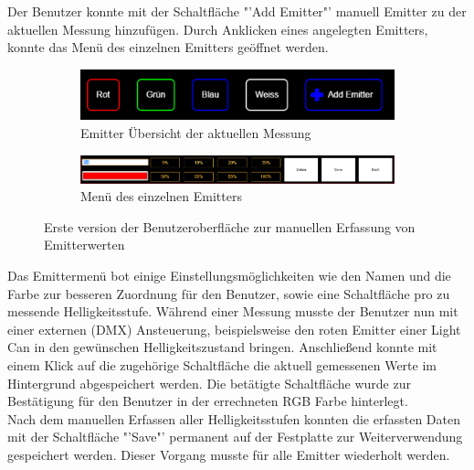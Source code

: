 \documentclass[11pt]{scrartcl}
\begin{document}
Der Benutzer konnte mit der Schaltfläche "'Add Emitter"' manuell Emitter zu der aktuellen Messung hinzufügen. Durch Anklicken eines angelegten
Emitters, konnte das Menü des einzelnen Emitters geöffnet werden.
\begin{figure}[H]
    \centering
    \begin{subfigure}[b]{\textwidth}
        \includegraphics[width=\textwidth]{images/app_emitters_v1.png}
        \caption{Emitter Übersicht der aktuellen Messung}
    \end{subfigure}
    \hfill 
    \begin{subfigure}[b]{\textwidth}
        \includegraphics[width=\textwidth]{images/app_edit_emitters_v1.png}
        \caption{Menü des einzelnen Emitters}
    \end{subfigure}
    \caption{Erste version der Benutzeroberfläche zur manuellen Erfassung von Emitterwerten}
\end{figure}
\noindent
Das Emittermenü bot einige Einstellungsmöglichkeiten wie den Namen und die Farbe zur besseren Zuordnung für den Benutzer, sowie eine Schaltfläche pro zu messende
Helligkeitsstufe. Während einer Messung musste der Benutzer nun mit einer externen (DMX) Ansteuerung, beispielsweise den roten
Emitter einer Light Can in den gewünschen Helligkeitszustand bringen. Anschließend konnte mit einem Klick auf die zugehörige Schaltfläche die
aktuell gemessenen Werte im Hintergrund abgespeichert werden. Die betätigte Schaltfläche wurde zur Bestätigung für den Benutzer in der errechneten
RGB Farbe hinterlegt.\\
Nach dem manuellen Erfassen aller Helligkeitsstufen konnten die erfassten Daten mit der Schaltfläche "'Save"' permanent auf der Festplatte zur
Weiterverwendung gespeichert werden. Dieser Vorgang musste für alle Emitter wiederholt werden.
\end{document}
